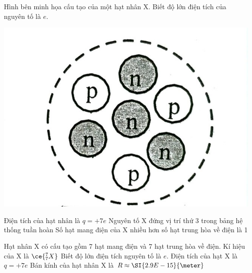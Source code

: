 \begin{ex}
	Hình bên minh họa cấu tạo của một hạt nhân X. Biết độ lớn điện tích của nguyên tố là $e$.
	\begin{center}
		\includegraphics[width=0.3\linewidth]{figs/VN12-Y24-PH-SYL-027P-1}
	\end{center}
	{Điện tích của hạt nhân là $q=+7e$}
	{\True Nguyên tố X đứng vị trí thứ 3 trong bảng hệ thống tuần hoàn}
	{Số hạt mang điện của X nhiều hơn số hạt trung hòa về điện là 1}
\end{ex}
\begin{ex}
	Hạt nhân X có cấu tạo gồm 7 hạt mang điện và 7 hạt trung hòa về điện.
	{Kí hiệu của X là $\ce{^7_7X}$}
	{\True Biết độ lớn điện tích nguyên tố là $e$. Điện tích của hạt X là $q=+7e$}
	{\True Bán kính của hạt nhân X là $R\approx\SI{2.9E-15}{\meter}$}
\end{ex}
